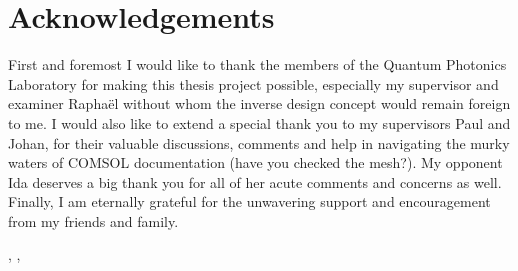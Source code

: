 \thispagestyle{plain}           %
\section*{Acknowledgements}

First and foremost I would like to thank the members of the Quantum Photonics
Laboratory for making this thesis project possible,
especially my supervisor and examiner Raphaël without whom the inverse design
concept would remain foreign to me.
I would also like to extend a special thank you to my supervisors Paul and Johan, for their valuable
discussions, comments and help in navigating the murky waters of COMSOL
documentation (have you checked the mesh?).
My opponent Ida deserves a big thank you for all of her acute comments and
concerns as well.
Finally, I am eternally grateful for the unwavering support and encouragement from
my friends and family.



\hfill
\thesisAuthor, \thesisCity, \thesisMonth\ \thesisYear

\if{}
\newpage                %
\thispagestyle{empty}
\mbox{}
\fi
